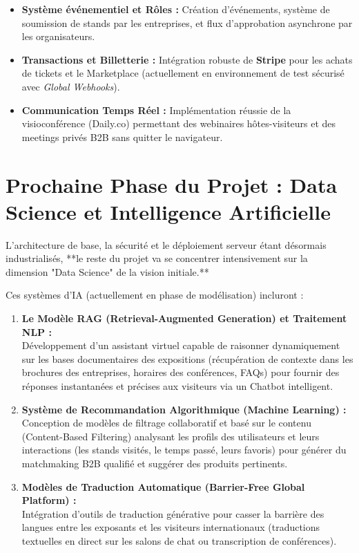 \documentclass[12pt,a4paper]{article}
\begin{document}
\begin{itemize}
    \item \textbf{Système événementiel et Rôles :} Création d'événements, système de soumission de stands par les entreprises, et flux d'approbation asynchrone par les organisateurs.
    \item \textbf{Transactions et Billetterie :} Intégration robuste de \textbf{Stripe} pour les achats de tickets et le Marketplace (actuellement en environnement de test sécurisé avec \textit{Global Webhooks}).
    \item \textbf{Communication Temps Réel :} Implémentation réussie de la visioconférence (Daily.co) permettant des webinaires hôtes-visiteurs et des meetings privés B2B sans quitter le navigateur.
\end{itemize}

\section{Prochaine Phase du Projet : Data Science et Intelligence Artificielle}
L'architecture de base, la sécurité et le déploiement serveur étant désormais industrialisés, **le reste du projet va se concentrer intensivement sur la dimension "Data Science" de la vision initiale.**

Ces systèmes d'IA (actuellement en phase de modélisation) incluront :

\begin{enumerate}
    \item \textbf{Le Modèle RAG (Retrieval-Augmented Generation) et Traitement NLP :} \\
    Développement d'un assistant virtuel capable de raisonner dynamiquement sur les bases documentaires des expositions (récupération de contexte dans les brochures des entreprises, horaires des conférences, FAQs) pour fournir des réponses instantanées et précises aux visiteurs via un Chatbot intelligent.
    
    \item \textbf{Système de Recommandation Algorithmique (Machine Learning) :} \\
    Conception de modèles de filtrage collaboratif et basé sur le contenu (Content-Based Filtering) analysant les profils des utilisateurs et leurs interactions (les stands visités, le temps passé, leurs favoris) pour générer du matchmaking B2B qualifié et suggérer des produits pertinents.
    
    \item \textbf{Modèles de Traduction Automatique (Barrier-Free Global Platform) :} \\
    Intégration d'outils de traduction générative pour casser la barrière des langues entre les exposants et les visiteurs internationaux (traductions textuelles en direct sur les salons de chat ou transcription de conférences).
\end{enumerate}
\end{document}
